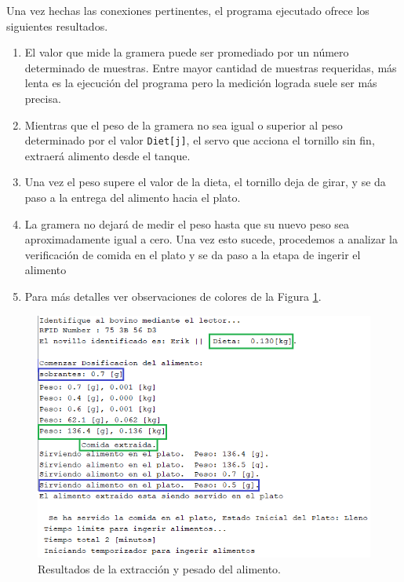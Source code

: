 Una vez hechas las conexiones pertinentes, el programa ejecutado ofrece los siguientes resultados.
\begin{enumerate}
    \item El valor que mide la gramera puede ser promediado por un número determinado de muestras. Entre mayor cantidad de muestras requeridas, más lenta es la ejecución del programa pero la medición lograda suele ser más precisa.
    \item Mientras que el peso de la gramera no sea igual o superior al peso determinado por el valor \texttt{Diet[j]}, el servo que acciona el tornillo sin fin, extraerá alimento desde el tanque.
    \item Una vez el peso supere el valor de la dieta, el tornillo deja de girar, y se da paso a la entrega del alimento hacia el plato.
    \item La gramera no dejará de medir el peso hasta que su nuevo peso sea aproximadamente igual a cero. Una vez esto sucede, procedemos a analizar la verificación de comida en el plato y se da paso a la etapa de ingerir el alimento
    \item Para más detalles ver observaciones de colores de la Figura \ref{resgramerapng}.
\end{enumerate}

\begin{figure}[H]
    \begin{center}
    	\includegraphics[scale=0.7]{img/resgramera.png}
    \end{center}
    \caption{Resultados de la extracción y pesado del alimento.} \label{resgramerapng}
\end{figure}

